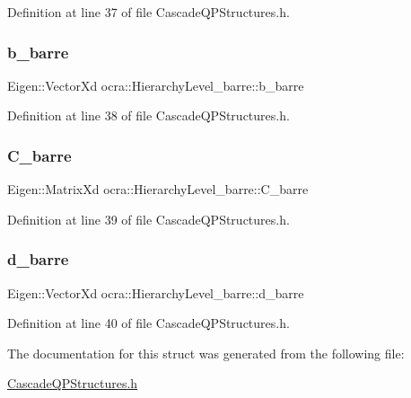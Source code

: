 Definition at line 37 of file Cascade\+Q\+P\+Structures.\+h.

\hypertarget{structocra_1_1HierarchyLevel__barre_a4b34116dea6da686e3b491a673adabde}{}\label{structocra_1_1HierarchyLevel__barre_a4b34116dea6da686e3b491a673adabde} 
\subsubsection{\texorpdfstring{b\+\_\+barre}{b\_barre}}
{\footnotesize\ttfamily Eigen\+::\+Vector\+Xd ocra\+::\+Hierarchy\+Level\+\_\+barre\+::b\+\_\+barre}



Definition at line 38 of file Cascade\+Q\+P\+Structures.\+h.

\hypertarget{structocra_1_1HierarchyLevel__barre_a3d60346fbdc2ff5c366b6b5f7b802af1}{}\label{structocra_1_1HierarchyLevel__barre_a3d60346fbdc2ff5c366b6b5f7b802af1} 
\subsubsection{\texorpdfstring{C\+\_\+barre}{C\_barre}}
{\footnotesize\ttfamily Eigen\+::\+Matrix\+Xd ocra\+::\+Hierarchy\+Level\+\_\+barre\+::\+C\+\_\+barre}



Definition at line 39 of file Cascade\+Q\+P\+Structures.\+h.

\hypertarget{structocra_1_1HierarchyLevel__barre_a65cc4a8fa90c825809493c2bbc921a3d}{}\label{structocra_1_1HierarchyLevel__barre_a65cc4a8fa90c825809493c2bbc921a3d} 
\subsubsection{\texorpdfstring{d\+\_\+barre}{d\_barre}}
{\footnotesize\ttfamily Eigen\+::\+Vector\+Xd ocra\+::\+Hierarchy\+Level\+\_\+barre\+::d\+\_\+barre}



Definition at line 40 of file Cascade\+Q\+P\+Structures.\+h.



The documentation for this struct was generated from the following file\+:\begin{DoxyCompactItemize}
\item 
\hyperlink{CascadeQPStructures_8h}{Cascade\+Q\+P\+Structures.\+h}\end{DoxyCompactItemize}
